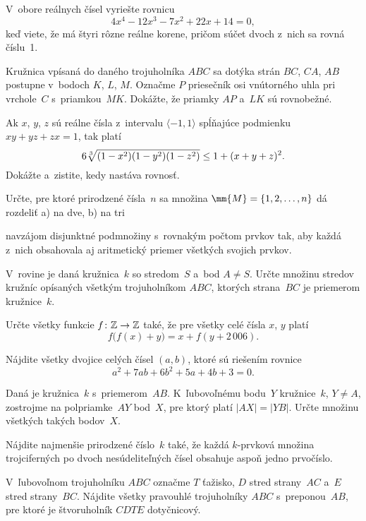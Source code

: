 ﻿{%
V~obore reálnych čísel vyriešte rovnicu
$$
4x^4-12x^3-7x^2+22x+14=0,
$$
keď viete, že má štyri rôzne reálne korene, pričom súčet dvoch
z~nich sa rovná číslu~1.}

{%
Kružnica vpísaná do daného trojuholníka $ABC$ sa dotýka strán $BC$,
$CA$, $AB$ postupne v~bodoch $K$, $L$, $M$. Označme $P$ priesečník
osi vnútorného uhla pri vrchole~$C$ s~priamkou~$MK$. Dokážte, že
priamky $AP$ a~$LK$ sú rovnobežné.}

{%
Ak $x$, $y$, $z$ sú reálne čísla z~intervalu $\langle-1,1\rangle$ spĺňajúce
podmienku $xy+yz+zx=1$, tak platí
$$
6\root3\of{(1-x^2)(1-y^2)(1-z^2)}\leq 1+(x+y+z)^2.
$$
Dokážte a~zistite, kedy nastáva rovnosť.}

{%
Určte, pre ktoré prirodzené čísla~$n$ sa množina
$\mm{M}=\{1,2,\dots ,n\}$ dá rozdeliť
\ite a) na dve,
\ite b) na tri

\noindent
navzájom disjunktné podmnožiny s~rovnakým počtom prvkov tak, aby
každá z~nich obsahovala aj aritmetický priemer všetkých svojich
prvkov.}

{%
V~rovine je daná kružnica~$k$ so stredom~$S$ a~bod $A\ne S$.
Určte množinu stredov kružníc opísaných všetkým trojuholníkom $ABC$,
ktorých strana~$BC$ je priemerom kružnice~$k$.}

{%
Určte všetky funkcie $f\colon\Bbb Z \to \Bbb Z$ také, že pre všetky celé
čísla $x$, $y$ platí
$$
f\bigl(f(x)+y\bigr)=x+f(y+2\,006).
$$}

{%
Nájdite všetky dvojice celých čísel $(a,b)$, ktoré sú riešením rovnice
$$
a^2+7ab+6b^2+5a+4b+3=0.
$$}

{%
Daná je kružnica~$k$ s~priemerom~$AB$. K~ľubovoľnému bodu~$Y$
kružnice~$k$, $Y\ne A$, zostrojme na polpriamke~$AY$ bod~$X$, pre
ktorý platí $|AX|=|YB|$. Určte množinu všetkých takých bodov~$X$.}

{%
Nájdite najmenšie prirodzené číslo~$k$ také, že každá $k$-prvková
množina trojciferných po dvoch nesúdeliteľných čísel obsahuje aspoň
jedno prvočíslo.}

{%
V~ľubovoľnom trojuholníku $ABC$ označme $T$ ťažisko, $D$ stred
strany~$AC$ a~$E$ stred strany~$BC$. Nájdite všetky pravouhlé
trojuholníky $ABC$ s~preponou~$AB$, pre ktoré je štvoruholník
$CDTE$ dotyčnicový.}

